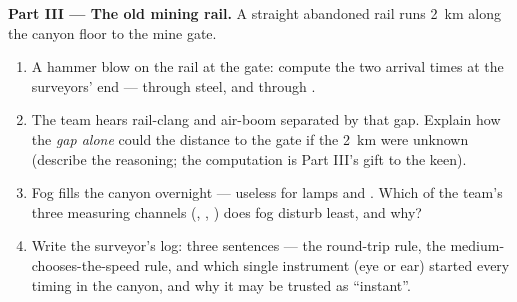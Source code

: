 \begin{problem}
\medskip\noindent\textbf{Part III --- The old mining rail.}
A straight abandoned rail runs \qty{2}{km} along the canyon
floor to the mine gate.
\begin{enumerate}[resume]
  \item A hammer blow on the rail at the gate: compute the two
        arrival times at the surveyors' end --- through steel,
        and through .
  \item The team hears rail-clang and air-boom separated by
        that gap. Explain how the \emph{gap alone} could
         the distance to the gate if the \qty{2}{km}
        were unknown (describe the reasoning; the computation
        is Part III's gift to the keen).
  \item Fog fills the canyon overnight --- useless for lamps
        and . Which of the team's three measuring
        channels (, , ) does fog
        disturb least, and why?
  \item Write the surveyor's log: three sentences --- the
        round-trip rule, the medium-chooses-the-speed rule,
        and which single instrument (eye or ear) started every
        timing in the canyon, and why it may be trusted as
        ``instant''.
\end{enumerate}
\end{problem}
